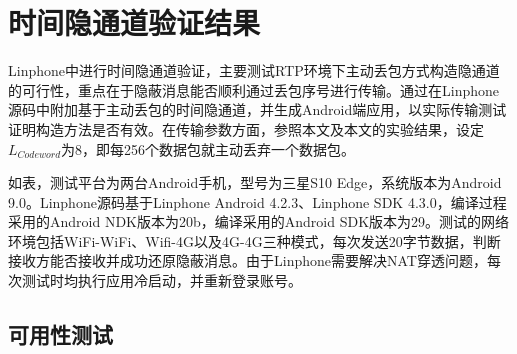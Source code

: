 \section{时间隐通道验证结果}
\label{chap:linphone:result}

Linphone中进行时间隐通道验证，主要测试RTP环境下主动丢包方式构造隐通道的可行性，重点在于隐蔽消息能否顺利通过丢包序号进行传输。通过在Linphone源码中附加基于主动丢包的时间隐通道，并生成Android端应用，以实际传输测试证明构造方法是否有效。在传输参数方面，参照本文及本文的实验结果，设定$L_{Codeword}$为8，即每256个数据包就主动丢弃一个数据包。


如表，测试平台为两台Android手机，型号为三星S10 Edge，系统版本为Android 9.0。Linphone源码基于Linphone Android 4.2.3、Linphone SDK 4.3.0，编译过程采用的Android NDK版本为20b，编译采用的Android SDK版本为29。测试的网络环境包括WiFi-WiFi、Wifi-4G以及4G-4G三种模式，每次发送20字节数据，判断接收方能否接收并成功还原隐蔽消息。由于Linphone需要解决NAT穿透问题，每次测试时均执行应用冷启动，并重新登录账号。

\subsection{可用性测试}
\label{chap:linphone:result:availablity}

